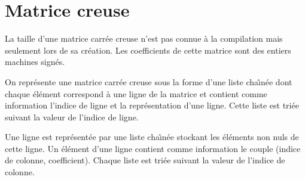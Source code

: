 \section{Matrice creuse}
La taille d'une matrice carr\'ee creuse n'est pas connue \`a la
compilation mais seulement lors de sa cr\'eation.  Les coefficients de
cette matrice sont des entiers machines sign\'es.
\par\smallskip
On repr\'esente une matrice carr\'ee creuse sous la forme d'une liste
cha\^\i{}n\'ee dont chaque \'el\'ement correspond \`a une ligne de la
matrice et contient comme information l'indice de ligne et la
repr\'esentation d'une ligne.  Cette liste est tri\'ee suivant la
valeur de l'indice de ligne.
\par\smallskip
Une ligne est repr\'esent\'ee par une liste cha\^\i{}n\'ee stockant les
\'el\'ements non nuls de cette ligne. Un \'el\'ement d'une ligne
contient comme information le couple (indice de colonne, coefficient).
Chaque liste est tri\'ee suivant la valeur de l'indice de colonne.


